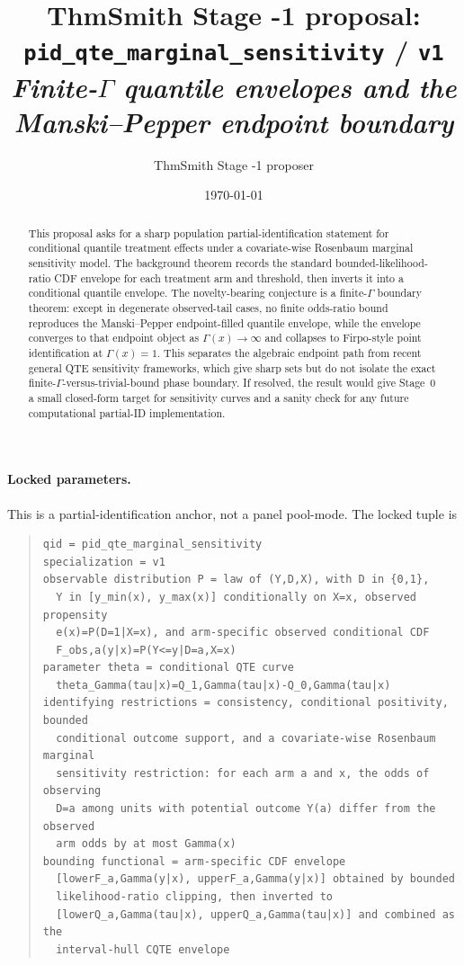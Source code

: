 \documentclass[11pt]{article}
\title{ThmSmith Stage -1 proposal: \texttt{pid\_qte\_marginal\_sensitivity} / \texttt{v1}%
  \\ \large\textit{Finite-\(\Gamma\) quantile envelopes and the Manski--Pepper endpoint boundary}}
\author{ThmSmith Stage -1 proposer}
\date{\today}
\theoremstyle{definition}
\theoremstyle{plain}
\theoremstyle{remark}
\begin{document}
\maketitle


\paragraph{Locked parameters.}
This is a partial-identification anchor, not a panel pool-mode.  The locked tuple is
\begin{quote}
\begin{verbatim}
qid = pid_qte_marginal_sensitivity
specialization = v1
observable distribution P = law of (Y,D,X), with D in {0,1},
  Y in [y_min(x), y_max(x)] conditionally on X=x, observed propensity
  e(x)=P(D=1|X=x), and arm-specific observed conditional CDF
  F_obs,a(y|x)=P(Y<=y|D=a,X=x)
parameter theta = conditional QTE curve
  theta_Gamma(tau|x)=Q_1,Gamma(tau|x)-Q_0,Gamma(tau|x)
identifying restrictions = consistency, conditional positivity, bounded
  conditional outcome support, and a covariate-wise Rosenbaum marginal
  sensitivity restriction: for each arm a and x, the odds of observing
  D=a among units with potential outcome Y(a) differ from the observed
  arm odds by at most Gamma(x)
bounding functional = arm-specific CDF envelope
  [lowerF_a,Gamma(y|x), upperF_a,Gamma(y|x)] obtained by bounded
  likelihood-ratio clipping, then inverted to
  [lowerQ_a,Gamma(tau|x), upperQ_a,Gamma(tau|x)] and combined as the
  interval-hull CQTE envelope
\end{verbatim}
\end{quote}

\begin{abstract}
This proposal asks for a sharp population partial-identification statement for conditional quantile treatment effects under a covariate-wise Rosenbaum marginal sensitivity model.  The background theorem records the standard bounded-likelihood-ratio CDF envelope for each treatment arm and threshold, then inverts it into a conditional quantile envelope.  The novelty-bearing conjecture is a finite-\(\Gamma\) boundary theorem: except in degenerate observed-tail cases, no finite odds-ratio bound reproduces the Manski--Pepper endpoint-filled quantile envelope, while the envelope converges to that endpoint object as \(\Gamma(x)\to\infty\) and collapses to Firpo-style point identification at \(\Gamma(x)=1\).  This separates the algebraic endpoint path from recent general QTE sensitivity frameworks, which give sharp sets but do not isolate the exact finite-\(\Gamma\)-versus-trivial-bound phase boundary.  If resolved, the result would give Stage~0 a small closed-form target for sensitivity curves and a sanity check for any future computational partial-ID implementation.
\end{abstract}
\end{document}
